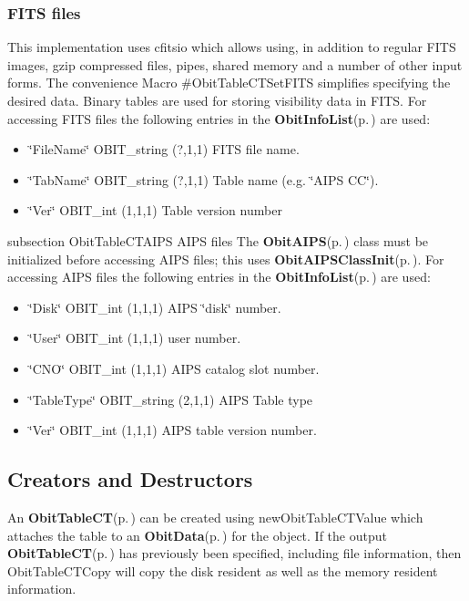 \subsubsection{FITS files}\label{ObitTableWX_8h_TableFITS}
This implementation uses cfitsio which allows using, in addition to regular FITS images, gzip compressed files, pipes, shared memory and a number of other input forms. The convenience Macro \#Obit\-Table\-CTSet\-FITS simplifies specifying the desired data. Binary tables are used for storing visibility data in FITS. For accessing FITS files the following entries in the {\bf Obit\-Info\-List}{\rm (p.\,\pageref{structObitInfoList})} are used: \begin{itemize}
\item \char`\"{}File\-Name\char`\"{} OBIT\_\-string (?,1,1) FITS file name. \item \char`\"{}Tab\-Name\char`\"{} OBIT\_\-string (?,1,1) Table name (e.g. \char`\"{}AIPS CC\char`\"{}). \item \char`\"{}Ver\char`\"{} OBIT\_\-int (1,1,1) Table version number\end{itemize}
subsection Obit\-Table\-CTAIPS AIPS files The {\bf Obit\-AIPS}{\rm (p.\,\pageref{structObitAIPS})} class must be initialized before accessing AIPS files; this uses {\bf Obit\-AIPSClass\-Init}{\rm (p.\,\pageref{ObitAIPS_8c_a5})}. For accessing AIPS files the following entries in the {\bf Obit\-Info\-List}{\rm (p.\,\pageref{structObitInfoList})} are used: \begin{itemize}
\item \char`\"{}Disk\char`\"{} OBIT\_\-int (1,1,1) AIPS \char`\"{}disk\char`\"{} number. \item \char`\"{}User\char`\"{} OBIT\_\-int (1,1,1) user number. \item \char`\"{}CNO\char`\"{} OBIT\_\-int (1,1,1) AIPS catalog slot number. \item \char`\"{}Table\-Type\char`\"{} OBIT\_\-string (2,1,1) AIPS Table type \item \char`\"{}Ver\char`\"{} OBIT\_\-int (1,1,1) AIPS table version number.\end{itemize}
\subsection{Creators and Destructors}\label{ObitTableCT_8h_ObitTableCTaccess}
An {\bf Obit\-Table\-CT}{\rm (p.\,\pageref{structObitTableCT})} can be created using new\-Obit\-Table\-CTValue which attaches the table to an {\bf Obit\-Data}{\rm (p.\,\pageref{structObitData})} for the object. If the output {\bf Obit\-Table\-CT}{\rm (p.\,\pageref{structObitTableCT})} has previously been specified, including file information, then Obit\-Table\-CTCopy will copy the disk resident as well as the memory resident information.

